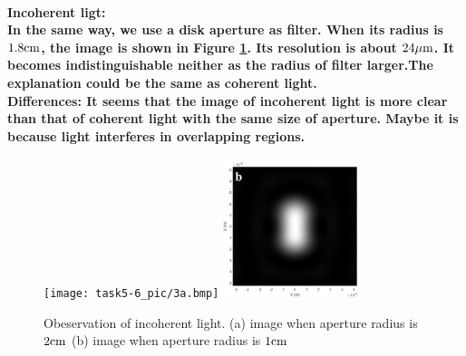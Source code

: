\documentclass[fontsize=11pt]{scrartcl}
\begin{document}
\paragraph{\bf{Incoherent ligt:} \\
In the same way, we use a disk aperture as filter. 
 When its radius is $1.8\rm {cm}$, the image is shown in Figure \ref{resolution}. Its resolution is about $24\rm {\mu m}$.
 It becomes indistinguishable neither as the radius of filter larger.The explanation could be the same as coherent light. \\
 \bf {Differences:}
 It seems that the image of incoherent light is more clear than that of coherent light with the same size of aperture.
 Maybe it is because light interferes in overlapping regions.}
 \begin{figure}[ht]
    \centering
    \texttt{[image: task5-6\_pic/3a.bmp]}
    \includegraphics[width=0.35\textwidth]{task5-6_pic/3b.png}
    \caption{Obeservation of incoherent light. (a) image when aperture radius is $2\rm {cm}$
     (b) image when aperture radius is $1\rm {cm}$}
    \label{resolution}
\end{figure}
\end{document}
